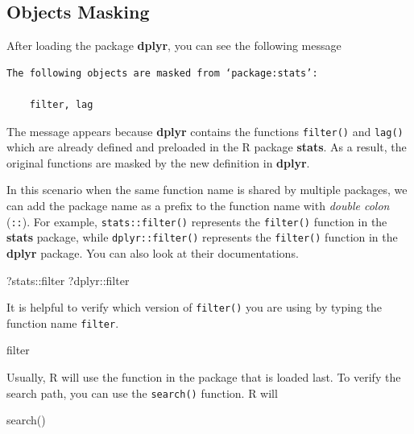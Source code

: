 \documentclass[
]{book}
\newenvironment{Shaded}{\begin{snugshade}}{\end{snugshade}}
\newcommand{\FunctionTok}[1]{\textcolor[rgb]{0.00,0.00,0.00}{#1}}
\newcommand{\NormalTok}[1]{#1}
\newcommand{\SpecialCharTok}[1]{\textcolor[rgb]{0.00,0.00,0.00}{#1}}
\begin{document}
\hypertarget{objects-masking}{%
\subsection{Objects Masking}\label{objects-masking}}

After loading the package \textbf{dplyr}, you can see the following message

\begin{verbatim}
The following objects are masked from ‘package:stats’:

    filter, lag
\end{verbatim}

The message appears because \textbf{dplyr} contains the functions \texttt{filter()} and \texttt{lag()} which are already defined and preloaded in the R package \textbf{stats}. As a result, the original functions are masked by the new definition in \textbf{dplyr}.

In this scenario when the same function name is shared by multiple packages, we can add the package name as a prefix to the function name with \emph{double colon} (\texttt{::}). For example, \texttt{stats::filter()} represents the \texttt{filter()} function in the \textbf{stats} package, while \texttt{dplyr::filter()} represents the \texttt{filter()} function in the \textbf{dplyr} package. You can also look at their documentations.

\begin{Shaded}
\begin{Highlighting}[]
\NormalTok{?stats}\SpecialCharTok{::}\NormalTok{filter}
\NormalTok{?dplyr}\SpecialCharTok{::}\NormalTok{filter}
\end{Highlighting}
\end{Shaded}

It is helpful to verify which version of \texttt{filter()} you are using by typing the function name \texttt{filter}.

\begin{Shaded}
\begin{Highlighting}[]
\NormalTok{filter}
\end{Highlighting}
\end{Shaded}

Usually, R will use the function in the package that is loaded last. To verify the search path, you can use the \texttt{search()} function. R will

\begin{Shaded}
\begin{Highlighting}[]
\FunctionTok{search}\NormalTok{()}
\end{Highlighting}
\end{Shaded}
\end{document}
